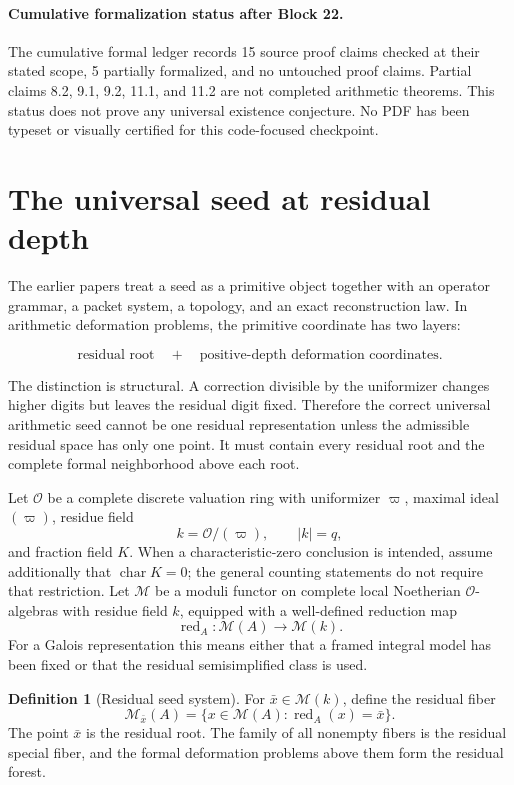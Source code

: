 \documentclass[11pt]{article}
\theoremstyle{definition}
\newtheorem{definition}[theorem]{Definition}
\theoremstyle{remark}
\newcommand{\Ocal}{\mathcal O}
\newcommand{\red}{\operatorname{red}}
\begin{document}
\paragraph{Cumulative formalization status after Block 22.}
The cumulative formal ledger records 15 source proof claims checked at their
stated scope, 5 partially formalized, and no untouched proof claims. Partial
claims 8.2, 9.1, 9.2, 11.1, and 11.2 are not completed arithmetic theorems.
This status does not prove any universal existence conjecture. No PDF has been
typeset or visually certified for this code-focused checkpoint.

\tableofcontents
\newpage

\section{The universal seed at residual depth}

The earlier papers treat a seed as a primitive object together with an operator grammar, a packet system, a topology, and an exact reconstruction law.  In arithmetic deformation problems, the primitive coordinate has two layers:

\[
\boxed{
\text{residual root}
\quad+\quad
\text{positive-depth deformation coordinates}.
}
\]

The distinction is structural.  A correction divisible by the uniformizer changes higher digits but leaves the residual digit fixed.  Therefore the correct universal arithmetic seed cannot be one residual representation unless the admissible residual space has only one point.  It must contain every residual root and the complete formal neighborhood above each root.

Let \(\Ocal\) be a complete discrete valuation ring with uniformizer \(\varpi\), maximal ideal \((\varpi)\), residue field
\[
k=\Ocal/(\varpi),\qquad |k|=q,
\]
and fraction field \(K\).  When a characteristic-zero conclusion is intended, assume additionally that \(\operatorname{char}K=0\); the general counting statements do not require that restriction.  Let \(\mathcal M\) be a moduli functor on complete local Noetherian \(\Ocal\)-algebras with residue field \(k\), equipped with a well-defined reduction map
\[
\red_A:\mathcal M(A)\longrightarrow \mathcal M(k).
\]
For a Galois representation this means either that a framed integral model has been fixed or that the residual semisimplified class is used.

\begin{definition}[Residual seed system]
For \(\bar x\in\mathcal M(k)\), define the residual fiber
\[
\mathcal M_{\bar x}(A)
=
\{x\in\mathcal M(A):\red_A(x)=\bar x\}.
\]
The point \(\bar x\) is the residual root.  The family of all nonempty fibers is the residual special fiber, and the formal deformation problems above them form the residual forest.
\end{definition}
\end{document}
